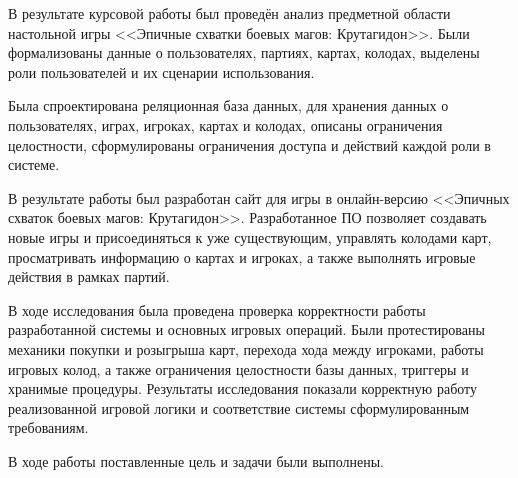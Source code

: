 
В результате курсовой работы был проведён анализ предметной области настольной
игры <<Эпичные схватки боевых магов: Крутагидон>>. Были формализованы данные о
пользователях, партиях, картах, колодах, выделены роли пользователей и их
сценарии использования.

Была спроектирована реляционная база данных, для хранения данных о
пользователях, играх, игроках, картах и колодах, описаны ограничения
целостности,
сформулированы ограничения доступа и действий каждой роли в системе.

В результате работы был разработан сайт для игры в онлайн-версию <<Эпичных
схваток боевых магов: Крутагидон>>.
Разработанное ПО позволяет создавать новые игры и присоединяться к уже
существующим, управлять колодами карт, просматривать информацию о картах и
игроках, а также выполнять игровые действия в рамках партий.

В ходе исследования была проведена проверка корректности работы разработанной
системы и основных игровых операций. Были протестированы механики покупки и
розыгрыша карт, перехода хода между игроками, работы игровых колод, а также
ограничения целостности базы данных, триггеры и хранимые процедуры. Результаты
исследования показали корректную работу реализованной игровой логики и
соответствие системы сформулированным требованиям.

В ходе работы поставленные цель и задачи были выполнены.